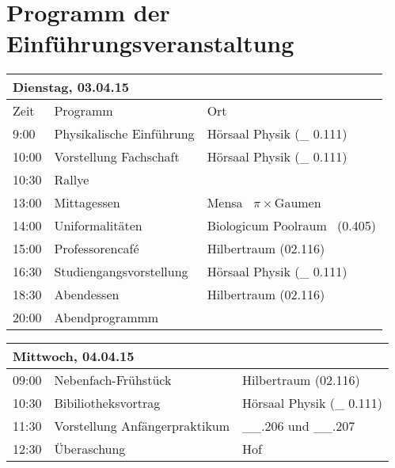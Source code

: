\section{Programm der Einführungsveranstaltung}

\bigskip

\begin{centering}
\renewcommand{\arraystretch}{1.5}
\begin{tabular}{|p{1.5cm}||p{8cm}  |p{5cm}|}
  \hline
  \multicolumn{3}{|l|}{\textbf{Dienstag, 03.04.15}}				\\ \hline
  Zeit	& Programm					& Ort			\\ \hline
  9:00	& Physikalische Einführung	 & Hörsaal Physik (\_ 0.111)		\\ \hline
  10:00	& Vorstellung Fachschaft	& Hörsaal Physik (\_ 0.111)		\\ \hline
  10:30	& Rallye			& 	\\ \hline
  13:00	& Mittagessen		& Mensa	\ $\pi \times$Gaumen		\\ \hline
  14:00	& Uniformalitäten & 	Biologicum Poolraum \ (0.405) \\ \hline		
  15:00	& Professorencafé 		& Hilbertraum (02.116) 		\\ \hline
  16:30	& Studiengangsvorstellung & Hörsaal Physik (\_ 0.111) 		\\ \hline
  18:30 & Abendessen 			&	Hilbertraum (02.116) 		\\ \hline
  20:00 & Abendprogrammm	        &	 \\ \hline
\end{tabular}
\end{centering}

\begin{centering}
\renewcommand{\arraystretch}{1.5}
\begin{tabular}{|p{1.5cm}||p{8cm}  |p{5cm}|}
  \hline  
  \multicolumn{3}{|l|}{\textbf{Mittwoch, 04.04.15}} 			\\ \hline
  09:00 & Nebenfach-Frühstück & Hilbertraum (02.116) \\ \hline
  10:30 & Bibiliotheksvortrag & Hörsaal Physik (\_ 0.111) \\ \hline
  11:30 & Vorstellung Anfängerpraktikum & \_\_.206 und \_\_.207 \\ \hline
  12:30 & Überaschung & Hof \\ \hline
   	
\end{tabular}
\end{centering}

